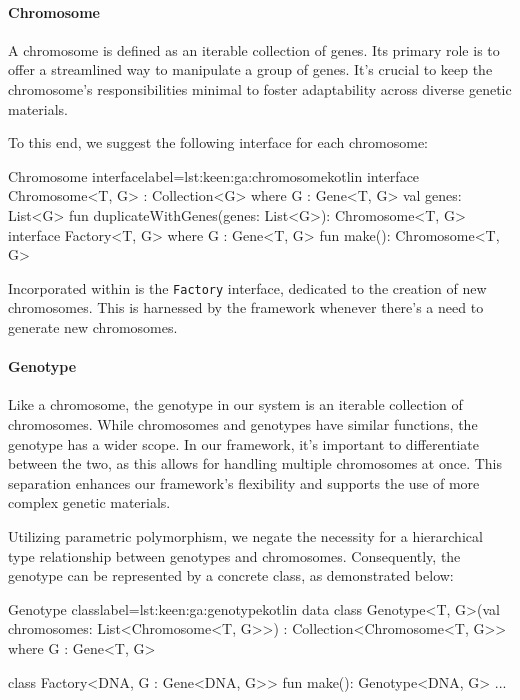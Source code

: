   \paragraph{Chromosome}
    A chromosome is defined as an iterable collection of genes.
    Its primary role is to offer a streamlined way to manipulate a group 
    of genes.
    It's crucial to keep the chromosome's responsibilities minimal to 
    foster adaptability across diverse genetic materials.
    
    To this end, we suggest the following interface for each chromosome:
    
    \begin{code}{Chromosome interface}{label={lst:keen:ga:chromosome}}{kotlin}
      interface Chromosome<T, G> : Collection<G> where G : Gene<T, G> {
          val genes: List<G>
          fun duplicateWithGenes(genes: List<G>): Chromosome<T, G>
          interface Factory<T, G> where G : Gene<T, G> {
              fun make(): Chromosome<T, G>
          }
      }
    \end{code}
    
    Incorporated within is the \texttt{Factory} interface, dedicated to 
    the creation of new chromosomes.
    This is harnessed by the framework whenever there's a need to generate 
    new chromosomes.

  \paragraph{Genotype}
    Like a chromosome, the genotype in our system is an iterable collection of chromosomes. While chromosomes and genotypes have similar functions, the genotype has a wider scope. In our framework, it's important to differentiate between the two, as this allows for handling multiple chromosomes at once. This separation enhances our framework's flexibility and supports the use of more complex genetic materials.
    
    Utilizing parametric polymorphism, we negate the necessity for a 
    hierarchical type relationship between genotypes and chromosomes.
    Consequently, the genotype can be represented by a concrete class, as 
    demonstrated below:
    
    \begin{code}{Genotype class}{label={lst:keen:ga:genotype}}{kotlin}
      data class Genotype<T, G>(val chromosomes: List<Chromosome<T, G>>) :
          Collection<Chromosome<T, G>> where G : Gene<T, G> {
    
          class Factory<DNA, G : Gene<DNA, G>> {
              fun make(): Genotype<DNA, G> { ... }
          }
      }
    \end{code}
    
